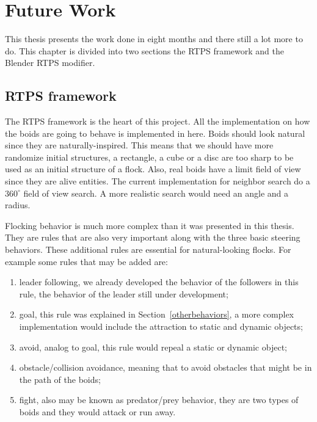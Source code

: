 \chapter{Future Work}

This thesis presents the work done in eight months and there still a lot more to do. This chapter is  divided into two sections the RTPS framework and the Blender RTPS modifier.

\section{RTPS framework}

The RTPS framework is the heart of this project. All the implementation on how the boids are going to behave is implemented in here. Boids should look natural since they are naturally-inspired. This means that we should have more randomize initial structures, a rectangle, a cube or a disc are too sharp to be used as an initial structure of a flock. Also, real boids have a limit field of view since they are alive entities. The current implementation for neighbor search do a $360^{\circ}$ field of view search. A more realistic search would need an angle and a radius.

Flocking behavior is much more complex than it was presented in this thesis. They are rules that are also very important along with the three basic steering behaviors. These additional rules are essential for natural-looking flocks. For example some rules that may be added are: 

\begin{enumerate}
\item{leader following, we already developed the behavior of the followers in this rule, the behavior of the leader still under development;}
\item{goal, this rule was explained in Section~\ref{otherbehaviors}, a more complex implementation would include the attraction to static and dynamic objects;}
\item{avoid, analog to goal, this rule would repeal a static or dynamic object;} 
\item{obstacle/collision avoidance, meaning that to avoid obstacles that might be in the path of the boids;}
\item{fight, also may be known as predator/prey behavior, they are two types of boids and they would attack or run away.}
\end{enumerate}

